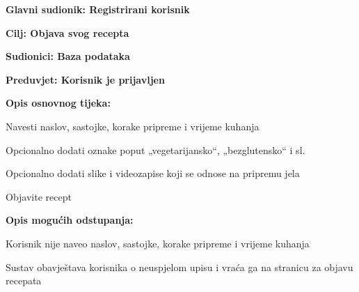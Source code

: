 	\noindent {}
	\begin{packed_item}
		
		\item \textbf{Glavni sudionik: Registrirani korisnik }
		\item  \textbf{Cilj: Objava svog recepta} 
		\item  \textbf{Sudionici: Baza podataka} 
		\item  \textbf{Preduvjet: Korisnik je prijavljen} 
		\item  \textbf{Opis osnovnog tijeka:}
		
		\item[] \begin{packed_enum}
			
			\item Navesti naslov, sastojke, korake pripreme i vrijeme kuhanja
			\item Opcionalno dodati oznake poput „vegetarijansko“, „bezglutensko“ i sl.
			\item Opcionalno dodati slike i videozapise koji se odnose na pripremu jela
			\item Objavite recept
			
		\end{packed_enum}
		
		\item  \textbf{Opis mogućih odstupanja:}
		
		\item[] \begin{packed_item}
			
			\item[2.a] Korisnik nije naveo naslov, sastojke, korake pripreme i vrijeme kuhanja
			\item[] \begin{packed_enum}
				
				\item Sustav obavještava korisnika o neuspjelom upisu i vraća ga na stranicu za objavu recepata
				
			\end{packed_enum}
			
		\end{packed_item}
	\end{packed_item}
	
